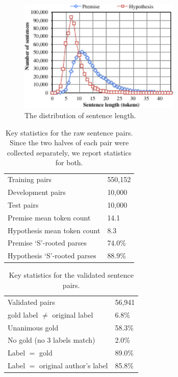 \begin{figure}
\center
\includegraphics[width=3.05in]{length_dist}
\caption{\label{b-table}The distribution of sentence length.} 
\end{figure}

\begin{table}
\center
  \begin{tabular}{l l} 
    \toprule
Training pairs &  550,152\\
Development pairs &  10,000\\
Test pairs & 10,000\\
\midrule
Premise mean token count & 14.1\\
Hypothesis mean token count & 8.3 \\
\midrule
Premise `S'-rooted parses & 74.0\%\\
Hypothesis `S'-rooted parses & 88.9\%\\
    \bottomrule
  \end{tabular}
\caption{\label{collection-stats}Key statistics for the raw sentence pairs. Since the two halves of each pair were collected separately, we report statistics for both.} 
\end{table}

\begin{table}
\center
  \begin{tabular}{l l} 
    \toprule
Validated pairs & 56,941\\
gold label $\ne$ original label & 6.8\%\\
Unanimous gold & 58.3\%\\
No gold (no 3 labels match) & 2.0\%\\
Label $=$ gold & 89.0\%\\
Label $=$ original author's label & 85.8\%\\
    \bottomrule
  \end{tabular}
\caption{\label{validation-stats}Key statistics for the validated sentence pairs.} 
\end{table}

